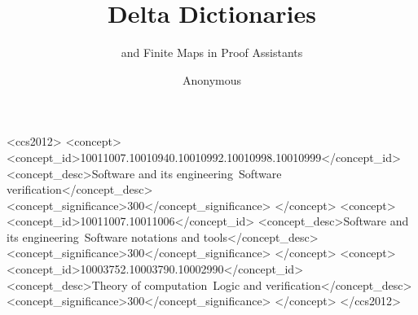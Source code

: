 \documentclass[nonacm=true]{acmart} \settopmatter{printfolios=true,printccs=false,printacmref=false}
\begin{document}



\title{Delta Dictionaries}
\subtitle{\total{} and \extensional{} Finite Maps in Proof Assistants}

\author{Anonymous}






\begin{CCSXML}
<ccs2012>
   <concept>
       <concept_id>10011007.10010940.10010992.10010998.10010999</concept_id>
       <concept_desc>Software and its engineering~Software verification</concept_desc>
       <concept_significance>300</concept_significance>
       </concept>
   <concept>
       <concept_id>10011007.10011006</concept_id>
       <concept_desc>Software and its engineering~Software notations and
tools</concept_desc>
       <concept_significance>300</concept_significance>
       </concept>
   <concept>
       <concept_id>10003752.10003790.10002990</concept_id>
       <concept_desc>Theory of computation~Logic and verification</concept_desc>
       <concept_significance>300</concept_significance>
       </concept>
 </ccs2012>
\end{CCSXML}

\end{document}
